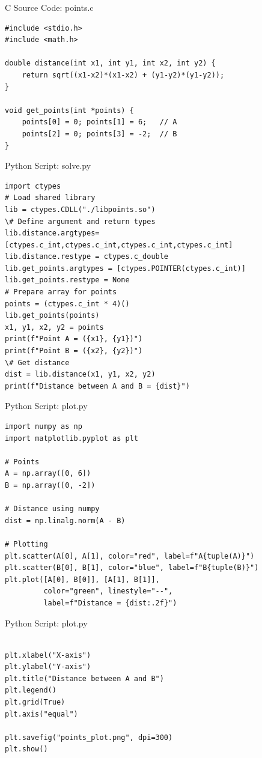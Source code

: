 \documentclass{beamer}
\numberwithin{equation}{section}
\theoremstyle{remark}
\begin{document}
\begin{frame}[fragile]{C Source Code: points.c}
\begin{verbatim}
#include <stdio.h>
#include <math.h>

double distance(int x1, int y1, int x2, int y2) {
    return sqrt((x1-x2)*(x1-x2) + (y1-y2)*(y1-y2));
}

void get_points(int *points) {
    points[0] = 0; points[1] = 6;   // A
    points[2] = 0; points[3] = -2;  // B
}
\end{verbatim}
\end{frame}

\begin{frame}[fragile]{Python Script: solve.py}
\begin{verbatim}
import ctypes
# Load shared library
lib = ctypes.CDLL("./libpoints.so")
\# Define argument and return types
lib.distance.argtypes=[ctypes.c_int,ctypes.c_int,ctypes.c_int,ctypes.c_int]
lib.distance.restype = ctypes.c_double
lib.get_points.argtypes = [ctypes.POINTER(ctypes.c_int)]
lib.get_points.restype = None
# Prepare array for points
points = (ctypes.c_int * 4)()
lib.get_points(points)
x1, y1, x2, y2 = points
print(f"Point A = ({x1}, {y1})")
print(f"Point B = ({x2}, {y2})")
\# Get distance
dist = lib.distance(x1, y1, x2, y2)
print(f"Distance between A and B = {dist}")
\end{verbatim}
\end{frame}

\begin{frame}[fragile]{Python Script: plot.py}
\begin{verbatim}
import numpy as np
import matplotlib.pyplot as plt

# Points
A = np.array([0, 6])
B = np.array([0, -2])

# Distance using numpy
dist = np.linalg.norm(A - B)

# Plotting
plt.scatter(A[0], A[1], color="red", label=f"A{tuple(A)}")
plt.scatter(B[0], B[1], color="blue", label=f"B{tuple(B)}")
plt.plot([A[0], B[0]], [A[1], B[1]],
         color="green", linestyle="--",
         label=f"Distance = {dist:.2f}")
\end{verbatim}
\end{frame}
\begin{frame}[fragile]{Python Script: plot.py}
\begin{verbatim}

plt.xlabel("X-axis")
plt.ylabel("Y-axis")
plt.title("Distance between A and B")
plt.legend()
plt.grid(True)
plt.axis("equal")

plt.savefig("points_plot.png", dpi=300)
plt.show()
\end{verbatim}
\end{frame}
\end{document}
